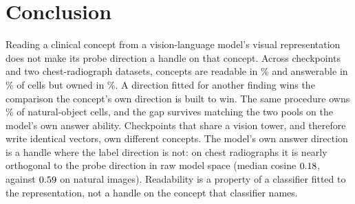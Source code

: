 \section{Conclusion}
\label{sec:conclusion}

Reading a clinical concept from a vision-language model's visual representation does not make its probe direction a handle on that concept. Across \cfCheckpoints{} checkpoints and two chest-radiograph datasets, concepts are readable in \cfChestReadablePct\% and answerable in \cfChestAnswerablePct\% of cells but owned in \cfChestOwnedPct\%. A direction fitted for another finding wins the comparison the concept's own direction is built to win. The same procedure owns \cfCocoOwnedPct\% of natural-object cells, and the gap survives matching the two pools on the model's own answer ability. Checkpoints that share a vision tower, and therefore write identical vectors, own different concepts. The model's own answer direction is a handle where the label direction is not: on chest radiographs it is nearly orthogonal to the probe direction in raw model space (median cosine $0.18$, against $0.59$ on natural images). Readability is a property of a classifier fitted to the representation, not a handle on the concept that classifier names.
